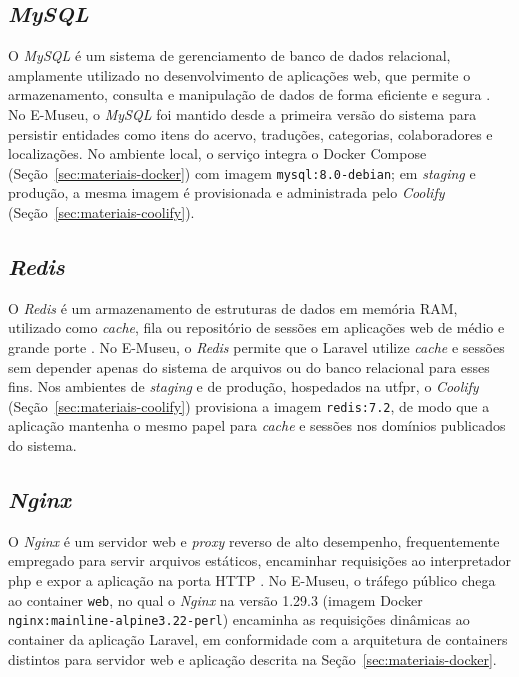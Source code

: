 \subsection{\textit{MySQL}}

O \textit{MySQL} é um sistema de gerenciamento de banco de dados relacional, amplamente utilizado no desenvolvimento de aplicações web, que permite o armazenamento, consulta e manipulação de dados de forma eficiente e segura \cite{mysql}. No E-Museu, o \textit{MySQL} foi mantido desde a primeira versão do sistema para persistir entidades como itens do acervo, traduções, categorias, colaboradores e localizações. No ambiente local, o serviço integra o Docker Compose (Seção~\ref{sec:materiais-docker}) com imagem \texttt{mysql:8.0-debian}; em \textit{staging} e produção, a mesma imagem é provisionada e administrada pelo \textit{Coolify} (Seção~\ref{sec:materiais-coolify}).


\subsection{\textit{Redis}}

O \textit{Redis} é um armazenamento de estruturas de dados em memória RAM, utilizado como \textit{cache}, fila ou repositório de sessões em aplicações web de médio e grande porte \cite{redis}. No E-Museu, o \textit{Redis} permite que o Laravel utilize \textit{cache} e sessões sem depender apenas do sistema de arquivos ou do banco relacional para esses fins. Nos ambientes de \textit{staging} e de produção, hospedados na \acrshort{utfpr}, o \textit{Coolify} (Seção~\ref{sec:materiais-coolify}) provisiona a imagem \texttt{redis:7.2}, de modo que a aplicação mantenha o mesmo papel para \textit{cache} e sessões nos domínios publicados do sistema.


\subsection{\textit{Nginx}}

O \textit{Nginx} é um servidor web e \textit{proxy} reverso de alto desempenho, frequentemente empregado para servir arquivos estáticos, encaminhar requisições ao interpretador \acrshort{php} e expor a aplicação na porta HTTP \cite{nginx}. No E-Museu, o tráfego público chega ao container \texttt{web}, no qual o \textit{Nginx} na versão 1.29.3 (imagem Docker \texttt{nginx:mainline-alpine3.22-perl}) encaminha as requisições dinâmicas ao container da aplicação Laravel, em conformidade com a arquitetura de containers distintos para servidor web e aplicação descrita na Seção~\ref{sec:materiais-docker}.



